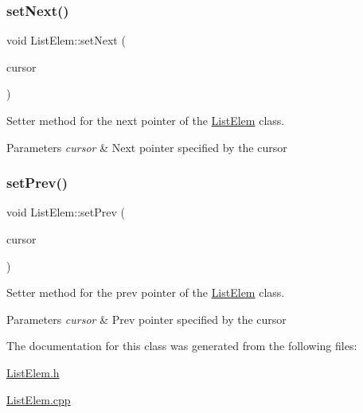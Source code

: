 \subsubsection{\texorpdfstring{set\+Next()}{setNext()}}
{\footnotesize\ttfamily void List\+Elem\+::set\+Next (\begin{DoxyParamCaption}\item[{\hyperlink{class_list_elem}{List\+Elem} $\ast$const}]{cursor }\end{DoxyParamCaption})}



Setter method for the \textquotesingle{}next\textquotesingle{} pointer of the \hyperlink{class_list_elem}{List\+Elem} class. 


\begin{DoxyParams}{Parameters}
{\em cursor} & Next pointer specified by the cursor \\
\hline
\end{DoxyParams}
\mbox{\label{class_list_elem_ada49e1aa9796260cd47a7315650a39e6}} 
\subsubsection{\texorpdfstring{set\+Prev()}{setPrev()}}
{\footnotesize\ttfamily void List\+Elem\+::set\+Prev (\begin{DoxyParamCaption}\item[{\hyperlink{class_list_elem}{List\+Elem} $\ast$const}]{cursor }\end{DoxyParamCaption})}



Setter method for the \textquotesingle{}prev\textquotesingle{} pointer of the \hyperlink{class_list_elem}{List\+Elem} class. 


\begin{DoxyParams}{Parameters}
{\em cursor} & Prev pointer specified by the cursor \\
\hline
\end{DoxyParams}


The documentation for this class was generated from the following files\+:\begin{DoxyCompactItemize}
\item 
\hyperlink{_list_elem_8h}{List\+Elem.\+h}\item 
\hyperlink{_list_elem_8cpp}{List\+Elem.\+cpp}\end{DoxyCompactItemize}
